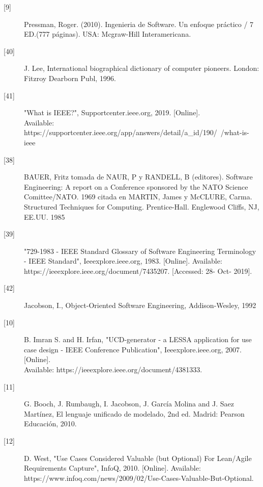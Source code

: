 \begin{description}
		\item[\hypertarget{b09}{[9]}] Pressman, Roger. (2010). Ingenieria de Software. Un enfoque práctico / 7 ED.(777 páginas). USA: Mcgraw-Hill Interamericana.
		
		\item[\hypertarget{b40}{[40]}] J. Lee, International biographical dictionary of computer pioneers. London: Fitzroy Dearborn Publ, 1996.
		
		\item[\hypertarget{b41}{[41]}] "What is IEEE?", Supportcenter.ieee.org, 2019. [Online].\\
		Available: https://supportcenter.ieee.org/app/answers/detail/a\_id/190/~/what-is-ieee
		
		\item[\hypertarget{b38}{[38]}] BAUER, Fritz tomada de NAUR, P y RANDELL, B (editores). Software Engineering: A report on a Conference sponsored by the NATO Science Comittee/NATO. 1969 citada en MARTIN, James y McCLURE, Carma. Structured
		Techniques for Computing. Prentice-Hall. Englewood Cliffs, NJ, EE.UU. 1985 
		
		\item[\hypertarget{b39}{[39]}] "729-1983 - IEEE Standard Glossary of Software Engineering Terminology - IEEE Standard", Ieeexplore.ieee.org, 1983. [Online]. Available: https://ieeexplore.ieee.org/document/7435207. [Accessed: 28- Oct- 2019].
		
		\item[\hypertarget{b42}{[42]}] Jacobson, I., Object-Oriented Software Engineering, Addison-Wesley, 1992
		
		\item[\hypertarget{b10}{[10]}] B. Imran S. and H. Irfan, "UCD-generator - a LESSA application for use case design - IEEE Conference Publication", Ieeexplore.ieee.org, 2007. [Online]. \\Available: https://ieeexplore.ieee.org/document/4381333.
		
		\item[\hypertarget{b11}{[11]}] G. Booch, J. Rumbaugh, I. Jacobson, J. García Molina and J. Saez Martínez, El lenguaje unificado de modelado, 2nd ed. Madrid: Pearson Educación, 2010.
		
		\item[\hypertarget{b12}{[12]}] D. West, "Use Cases Considered Valuable (but Optional) For Lean/Agile Requirements Capture", InfoQ, 2010. [Online]. Available: https://www.infoq.com/news/2009/02/Use-Cases-Valuable-But-Optional. 
		

\end{description}
